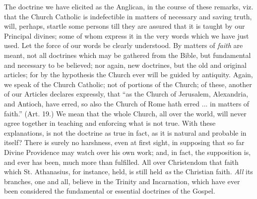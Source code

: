 The
doctrine we have elicited as the Anglican, in the course of these
remarks, viz. that the Church Catholic is indefectible in matters of
necessary and saving truth, will, perhaps, startle some persons till
they are assured that it is taught by our Principal divines; some of
whom express it in the very words which we have just used. Let the force
of our words be clearly understood. By matters of \emph{faith} are
meant, not all doctrines which may be gathered from the Bible, but
fundamental and necessary to be believed; nor again, new doctrines, but
the old and original articles; for by the hypothesis the Church ever
will be guided by antiquity. Again, we speak of the Church Catholic; not
of portions of the Church; of these, another of our Articles declares
expressly, that ``as the Church of Jerusalem, Alexandria, and Antioch,
have erred, so also the Church of Rome hath erred ... in matters of
faith.'' (Art. 19.) We mean that the whole Church, all over the world,
will never agree together in teaching and enforcing what is not true.
With these explanations, is not the doctrine as true in fact, as it is
natural and probable in itself? There is surely no harshness, even at
first sight, in supposing that so far Divine Providence may watch over
his own work; and, in fact, the supposition is, and ever has been, much
more than fulfilled. All over Christendom that faith which St.
Athanasius, for instance, held, is still held \emph{as} the Christian
faith. \emph{All} its branches, one and all, believe in the Trinity and
Incarnation, which have ever been considered the fundamental or
essential doctrines of the Gospel.

